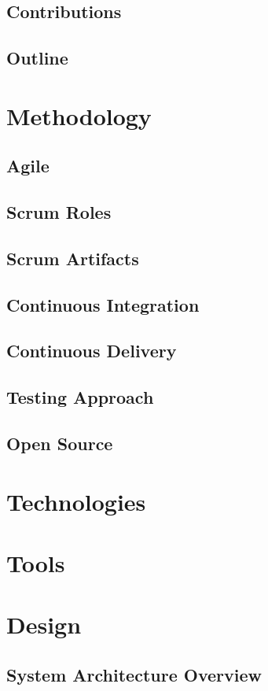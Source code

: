 \documentclass{article}
\begin{document}
\subsection{Contributions}
\subsection{Outline}
\section{Methodology}
\subsection{Agile}
\subsection{Scrum Roles}
\subsection{Scrum Artifacts}
\subsection{Continuous Integration}
\subsection{Continuous Delivery}
\subsection{Testing Approach}
\subsection{Open Source}
\section{Technologies}
\section{Tools}
\section{Design}
\subsection{System Architecture Overview}
\end{document}
